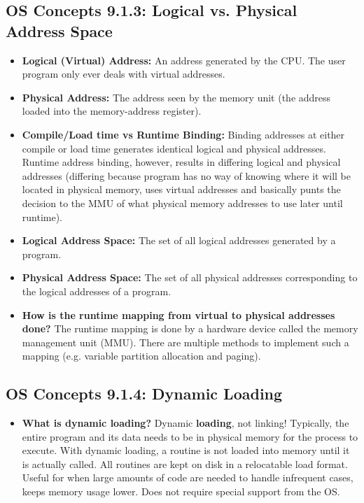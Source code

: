 \documentclass[12pt]{article}
\begin{document}
\subsection*{OS Concepts 9.1.3: Logical vs. Physical Address Space}

\begin{itemize}
    \item \textbf{Logical (Virtual) Address:} An address generated by the CPU. The user program only ever deals with virtual addresses.
    \item \textbf{Physical Address:} The address seen by the memory unit (the address loaded into the memory-address register).
    \item \textbf{Compile/Load time vs Runtime Binding:} Binding addresses at either compile or load time generates identical logical and physical addresses. Runtime address binding, however, results in differing logical and physical addresses (differing because program has no way of knowing where it will be located in physical memory, uses virtual addresses and basically punts the decision to the MMU of what physical memory addresses to use later until runtime).
    \item \textbf{Logical Address Space:} The set of all logical addresses generated by a program.
    \item \textbf{Physical Address Space:} The set of all physical addresses corresponding to the logical addresses of a program.
    \item \textbf{How is the runtime mapping from virtual to physical addresses done?} The runtime mapping is done by a hardware device called the memory management unit (MMU). There are multiple methods to implement such a mapping (e.g. variable partition allocation and paging).
\end{itemize}

\subsection*{OS Concepts 9.1.4: Dynamic Loading}

\begin{itemize}
    \item \textbf{What is dynamic loading?} Dynamic \textbf{loading}, not linking! Typically, the entire program and its data needs to be in physical memory for the process to execute. With dynamic loading, a routine is not loaded into memory until it is actually called. All routines are kept on disk in a relocatable load format. Useful for when large amounts of code are needed to handle infrequent cases, keeps memory usage lower. Does not require special support from the OS.
\end{itemize}
\end{document}
